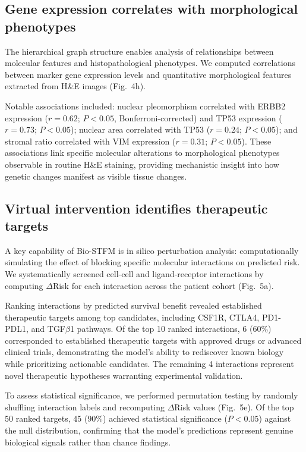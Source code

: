 \documentclass[pdflatex,sn-nature]{sn-jnl}%
\theoremstyle{thmstyleone}%
\theoremstyle{thmstyletwo}%
\theoremstyle{thmstylethree}%
\begin{document}
\subsection{Gene expression correlates with morphological phenotypes}\label{subsec11}

The hierarchical graph structure enables analysis of relationships between molecular features and histopathological phenotypes. We computed correlations between marker gene expression levels and quantitative morphological features extracted from H\&E images (Fig.~4h).

Notable associations included: nuclear pleomorphism correlated with ERBB2 expression ($r = 0.62$; $P < 0.05$, Bonferroni-corrected) and TP53 expression ($r = 0.73$; $P < 0.05$); nuclear area correlated with TP53 ($r = 0.24$; $P < 0.05$); and stromal ratio correlated with VIM expression ($r = 0.31$; $P < 0.05$). These associations link specific molecular alterations to morphological phenotypes observable in routine H\&E staining, providing mechanistic insight into how genetic changes manifest as visible tissue changes.

\subsection{Virtual intervention identifies therapeutic targets}\label{subsec12}

A key capability of Bio-STFM is in silico perturbation analysis: computationally simulating the effect of blocking specific molecular interactions on predicted risk. We systematically screened cell-cell and ligand-receptor interactions by computing $\Delta$Risk for each interaction across the patient cohort (Fig.~5a).

Ranking interactions by predicted survival benefit revealed established therapeutic targets among top candidates, including CSF1R, CTLA4\cite{bib54,bib55}, PD1-PDL1\cite{bib20}, and TGF$\beta$1 pathways\cite{bib56}. Of the top 10 ranked interactions, 6 (60\%) corresponded to established therapeutic targets with approved drugs or advanced clinical trials, demonstrating the model's ability to rediscover known biology while prioritizing actionable candidates. The remaining 4 interactions represent novel therapeutic hypotheses warranting experimental validation.

To assess statistical significance, we performed permutation testing by randomly shuffling interaction labels and recomputing $\Delta$Risk values (Fig.~5e). Of the top 50 ranked targets, 45 (90\%) achieved statistical significance ($P < 0.05$) against the null distribution, confirming that the model's predictions represent genuine biological signals rather than chance findings.
\end{document}
